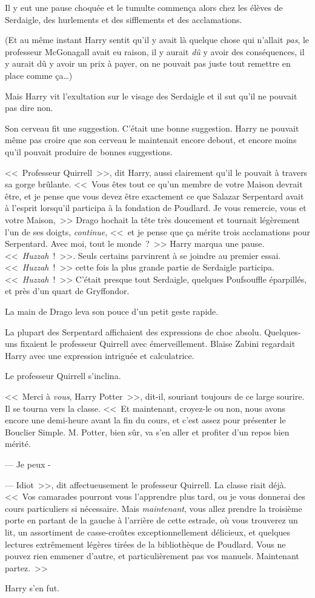 Il y eut une pause choquée et le tumulte commença alors chez les élèves de Serdaigle, des hurlements et des sifflements et des acclamations.

(Et au même instant Harry sentit qu'il y avait là quelque chose qui n'allait \emph{pas}, le professeur McGonagall avait eu raison, il y aurait \emph{dû} y avoir des conséquences, il y aurait dû y avoir un prix à payer, on ne pouvait pas juste tout remettre en place comme ça…)

Mais Harry vit l'exultation sur le visage des Serdaigle et il sut qu'il ne pouvait pas dire non.

Son cerveau fit une suggestion. C'était une bonne suggestion. Harry ne pouvait même pas croire que son cerveau le maintenait encore debout, et encore moins qu'il pouvait produire de bonnes suggestions.

<<~Professeur Quirrell~>>, dit Harry, aussi clairement qu'il le pouvait à travers sa gorge brûlante. <<~Vous êtes tout ce qu'un membre de votre Maison devrait être, et je pense que vous devez être exactement ce que Salazar Serpentard avait à l'esprit lorsqu'il participa à la fondation de Poudlard. Je vous remercie, vous et votre Maison,~>> Drago hochait la tête très doucement et tournait légèrement l'un de ses doigts, \emph{continue}, <<~et je pense que ça mérite trois acclamations pour Serpentard. Avec moi, tout le monde~?~>> Harry marqua une pause. <<~\emph{Huzzah}~!~>>. Seuls certains parvinrent à se joindre au premier essai. <<~\emph{Huzzah}~!~>> cette fois la plus grande partie de Serdaigle participa. <<~\emph{Huzzah}~!~>> C'était presque tout Serdaigle, quelques Poufsouffle éparpillés, et près d'un quart de Gryffondor.

La main de Drago leva son pouce d'un petit geste rapide.

La plupart des Serpentard affichaient des expressions de choc absolu. Quelques-uns fixaient le professeur Quirrell avec émerveillement. Blaise Zabini regardait Harry avec une expression intriguée et calculatrice.

Le professeur Quirrell s'inclina.

<<~Merci à \emph{vous}, Harry Potter~>>, dit-il, souriant toujours de ce large sourire. Il se tourna vers la classe. <<~Et maintenant, croyez-le ou non, nous avons encore une demi-heure avant la fin du cours, et c'est assez pour présenter le Bouclier Simple. M. Potter, bien sûr, va s'en aller et profiter d'un repos bien mérité.

--- Je peux -

--- Idiot~>>, dit affectueusement le professeur Quirrell. La classe riait déjà. <<~Vos camarades pourront vous l'apprendre plus tard, ou je vous donnerai des cours particuliers si nécessaire. Mais \emph{maintenant}, vous allez prendre la troisième porte en partant de la gauche à l'arrière de cette estrade, où vous trouverez un lit, un assortiment de casse-croûtes exceptionnellement délicieux, et quelques lectures extrêmement légères tirées de la bibliothèque de Poudlard. Vous ne pouvez rien emmener d'autre, et particulièrement pas vos manuels. Maintenant partez.~>>

Harry s'en fut.
